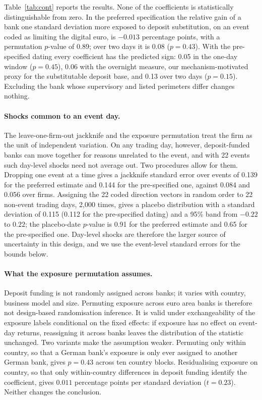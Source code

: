 \documentclass[11pt]{article}
\theoremstyle{plain}\newtheorem{proposition}{Proposition}
\begin{document}
Table~\ref{tab:cont} reports the results. None of the coefficients is statistically distinguishable from zero. In the preferred specification the relative gain of a bank one standard deviation more exposed to deposit substitution, on an event coded as limiting the digital euro, is $-0.013$ percentage points, with a permutation $p$-value of 0.89; over two days it is 0.08 ($p = 0.43$). With the pre-specified dating every coefficient has the predicted sign: 0.05 in the one-day window ($p = 0.45$), 0.06 with the overnight measure, our mechanism-motivated proxy for the substitutable deposit base, and 0.13 over two days ($p = 0.15$). Excluding the bank whose supervisory and listed perimeters differ changes nothing.

\paragraph{Shocks common to an event day.} The leave-one-firm-out jackknife and the exposure permutation treat the firm as the unit of independent variation. On any trading day, however, deposit-funded banks can move together for reasons unrelated to the event, and with 22 events such day-level shocks need not average out. Two procedures allow for them. Dropping one event at a time gives a jackknife standard error over events of 0.139 for the preferred estimate and 0.144 for the pre-specified one, against 0.084 and 0.056 over firms. Assigning the 22 coded direction vectors in random order to 22 non-event trading days, 2,000 times, gives a placebo distribution with a standard deviation of 0.115 (0.112 for the pre-specified dating) and a 95\% band from $-0.22$ to $0.22$; the placebo-date $p$-value is 0.91 for the preferred estimate and 0.65 for the pre-specified one. Day-level shocks are therefore the larger source of uncertainty in this design, and we use the event-level standard errors for the bounds below.

\paragraph{What the exposure permutation assumes.} Deposit funding is not randomly assigned across banks; it varies with country, business model and size. Permuting exposure across euro area banks is therefore not design-based randomisation inference. It is valid under exchangeability of the exposure labels conditional on the fixed effects: if exposure has no effect on event-day returns, reassigning it across banks leaves the distribution of the statistic unchanged. Two variants make the assumption weaker. Permuting only within country, so that a German bank's exposure is only ever assigned to another German bank, gives $p = 0.43$ across ten country blocks. Residualising exposure on country, so that only within-country differences in deposit funding identify the coefficient, gives $0.011$ percentage points per standard deviation ($t = 0.23$). Neither changes the conclusion.
\end{document}
